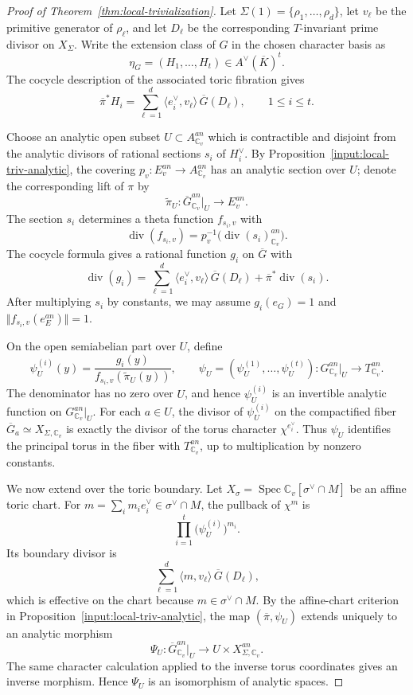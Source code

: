 \documentclass[10pt,a4paper]{amsart}
\begin{document}
\begin{proof}[Proof of Theorem~\ref{thm:local-trivialization}]
	Let \(\Sigma(1)=\{\rho_1,\ldots,\rho_d\}\), let \(v_\ell\) be the primitive
	generator of \(\rho_\ell\), and let \(D_\ell\) be the corresponding
	\(T\)-invariant prime divisor on \(X_\Sigma\).  Write the extension class of
	\(G\) in the chosen character basis as
	\[
	\eta_G=(H_1,\ldots,H_t)\in A^\vee(\overline K)^t .
	\]
	The cocycle description of the associated toric fibration gives
	\[
	\overline{\pi}^*H_i
	=
	\sum_{\ell=1}^{d}\langle e_i^\vee,v_\ell\rangle\,\overline G(D_\ell),
	\qquad 1\le i\le t.
	\]
	
	Choose an analytic open subset \(U\subset A_{\mathbb C_v}^{an}\) which is
	contractible and disjoint from the analytic divisors of rational sections
	\(s_i\) of \(H_i^\vee\).  By Proposition~\ref{input:local-triv-analytic}, the
	covering \(p_v:E_v^{an}\to A_{\mathbb C_v}^{an}\) has an analytic section over
	\(U\); denote the corresponding lift of \(\pi\) by
	\[
	\widetilde\pi_U:\overline G^{an}_{\mathbb C_v}|_U\longrightarrow E_v^{an}.
	\]
	The section \(s_i\) determines a theta function \(f_{s_i,v}\) with
	\[
	\operatorname{div}(f_{s_i,v})
	=
	p_v^{-1}\bigl(\operatorname{div}(s_i)^{an}_{\mathbb C_v}\bigr).
	\]
	The cocycle formula gives a rational function \(g_i\) on \(\overline G\) with
	\[
	\operatorname{div}(g_i)
	=
	\sum_{\ell=1}^{d}\langle e_i^\vee,v_\ell\rangle\,\overline G(D_\ell)
	+\overline\pi^*\operatorname{div}(s_i).
	\]
	After multiplying \(s_i\) by constants, we may assume
	\(g_i(e_G)=1\) and \(\Vert f_{s_i,v}(e_E^{an})\Vert=1\).
	
	On the open semiabelian part over \(U\), define
	\[
	\psi_U^{(i)}(y)
	=
	\frac{g_i(y)}{f_{s_i,v}(\widetilde\pi_U(y))},
	\qquad
	\psi_U=(\psi_U^{(1)},\ldots,\psi_U^{(t)}):G^{an}_{\mathbb C_v}|_U\to T^{an}_{\mathbb C_v}.
	\]
	The denominator has no zero over \(U\), and hence \(\psi_U^{(i)}\) is an
	invertible analytic function on \(G^{an}_{\mathbb C_v}|_U\).
	For each \(a\in U\), the divisor of \(\psi_U^{(i)}\) on the compactified
	fiber \(\overline G_a\simeq X_{\Sigma,\mathbb C_v}\) is exactly the divisor of
	the torus character \(\chi^{e_i^\vee}\).  Thus \(\psi_U\) identifies the
	principal torus in the fiber with \(T_{\mathbb C_v}^{an}\), up to multiplication
	by nonzero constants.
	
	We now extend over the toric boundary.  Let
	\(X_\sigma=\operatorname{Spec}\mathbb C_v[\sigma^\vee\cap M]\) be an affine
	toric chart.  For \(m=\sum_i m_ie_i^\vee\in\sigma^\vee\cap M\), the pullback
	of \(\chi^m\) is
	\[
	\prod_{i=1}^{t}\bigl(\psi_U^{(i)}\bigr)^{m_i}.
	\]
	Its boundary divisor is
	\[
	\sum_{\ell=1}^{d}\langle m,v_\ell\rangle\,\overline G(D_\ell),
	\]
	which is effective on the chart because \(m\in\sigma^\vee\cap M\).  By the
	affine-chart criterion in Proposition~\ref{input:local-triv-analytic}, the map
	\((\overline\pi,\psi_U)\) extends uniquely to an analytic morphism
	\[
	\Psi_U:
	\overline G^{an}_{\mathbb C_v}|_U
	\longrightarrow
	U\times X_{\Sigma,\mathbb C_v}^{an}.
	\]
	The same character calculation applied to the inverse torus coordinates gives
	an inverse morphism.  Hence \(\Psi_U\) is an isomorphism of analytic spaces.
	

\end{proof}
\end{document}
